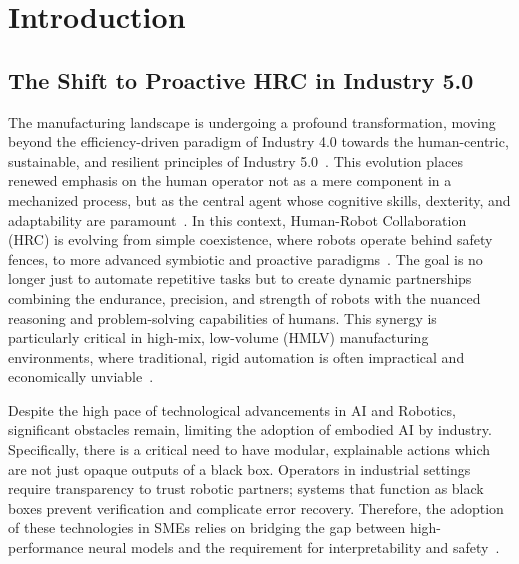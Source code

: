 \documentclass[sensors,article,submit,pdftex,moreauthors]{Definitions/mdpi}
\begin{document}
\section{Introduction}

\subsection{The Shift to Proactive HRC in Industry 5.0}

The manufacturing landscape is undergoing a profound transformation, moving beyond the efficiency-driven paradigm of Industry 4.0 towards the human-centric, sustainable, and resilient principles of Industry 5.0~\cite{Andronas2021}. This evolution places renewed emphasis on the human operator not as a mere component in a mechanized process, but as the central agent whose cognitive skills, dexterity, and adaptability are paramount~\cite{Polini2020}. In this context, Human-Robot Collaboration (HRC) is evolving from simple coexistence, where robots operate behind safety fences, to more advanced symbiotic and proactive paradigms~\cite{Andronas2021, Asad2023}. The goal is no longer just to automate repetitive tasks but to create dynamic partnerships combining the endurance, precision, and strength of robots with the nuanced reasoning and problem-solving capabilities of humans. This synergy is particularly critical in high-mix, low-volume (HMLV) manufacturing environments, where traditional, rigid automation is often impractical and economically unviable~\cite{Polini2020, David2023}.


Despite the high pace of technological advancements in AI and Robotics, significant obstacles remain, limiting the adoption of embodied AI by industry. Specifically, there is a critical need to have modular, explainable actions which are not just opaque outputs of a black box. Operators in industrial settings require transparency to trust robotic partners; systems that function as black boxes prevent verification and complicate error recovery. Therefore, the adoption of these technologies in SMEs relies on bridging the gap between high-performance neural models and the requirement for interpretability and safety~\cite{Adadi2018, Gunning2019}.
\end{document}
